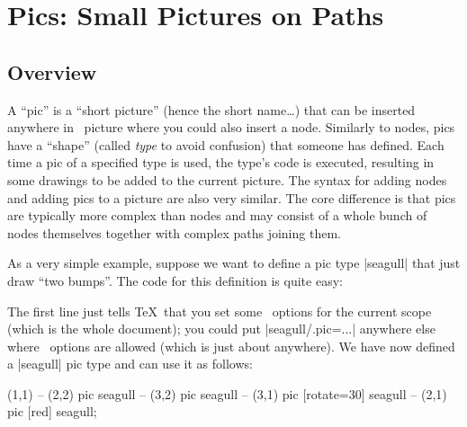 %
%
%

\section{Pics: Small Pictures on Paths}
\label{section-pics}

\subsection{Overview}

A ``pic'' is a ``short picture'' (hence the short name\dots) that can be
inserted anywhere in \tikzname\ picture where you could also insert a node.
Similarly to nodes, pics have a ``shape'' (called \emph{type} to avoid
confusion) that someone has defined. Each time a pic of a specified type is
used, the type's code is executed, resulting in some drawings to be added to
the current picture. The syntax for adding nodes and adding pics to a picture
are also very similar. The core difference is that pics are typically more
complex than nodes and may consist of a whole bunch of nodes themselves
together with complex paths joining them.

As a very simple example, suppose we want to define a pic type |seagull| that
just draw ``two bumps''. The code for this definition is quite easy:
%
\begin{codeexample}
\end{codeexample}

The first line just tells \TeX\ that you set some \tikzname\ options for the
current scope (which is the whole document); you could put |seagull/.pic=...|
anywhere else where \tikzname\ options are allowed (which is just about
anywhere). We have now defined a |seagull| pic type and can use it as follows:
%
\begin{codeexample}[]
\tikz \fill [fill=blue!20]
     (1,1)
  -- (2,2) pic             {seagull}
  -- (3,2) pic             {seagull}
  -- (3,1) pic [rotate=30] {seagull}
  -- (2,1) pic [red]       {seagull};
\end{codeexample}


